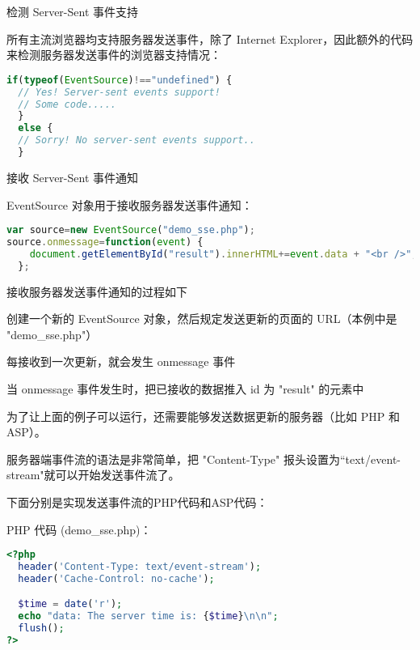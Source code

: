 \begin{compactenum}
\item 检测 Server-Sent 事件支持



所有主流浏览器均支持服务器发送事件，除了 Internet Explorer，因此额外的代码来检测服务器发送事件的浏览器支持情况：

\begin{lstlisting}[language=JavaScript]
  if(typeof(EventSource)!=="undefined") {
  // Yes! Server-sent events support!
  // Some code.....
  }
  else {
  // Sorry! No server-sent events support..
  }
\end{lstlisting}


\item 接收 Server-Sent 事件通知

EventSource 对象用于接收服务器发送事件通知：

\begin{lstlisting}[language=JavaScript]
var source=new EventSource("demo_sse.php");
source.onmessage=function(event) {
    document.getElementById("result").innerHTML+=event.data + "<br />";
  };
\end{lstlisting}

接收服务器发送事件通知的过程如下

\begin{compactitem}
\item 创建一个新的 EventSource 对象，然后规定发送更新的页面的 URL（本例中是 "demo\_sse.php"）
\item 每接收到一次更新，就会发生 onmessage 事件
\item 当 onmessage 事件发生时，把已接收的数据推入 id 为 "result" 的元素中
\end{compactitem}




\end{compactenum}


为了让上面的例子可以运行，还需要能够发送数据更新的服务器（比如 PHP 和 ASP）。

服务器端事件流的语法是非常简单，把 "Content-Type" 报头设置为``text/event-stream"就可以开始发送事件流了。

下面分别是实现发送事件流的PHP代码和ASP代码：

PHP 代码 (demo\_sse.php)：

\begin{lstlisting}[language=PHP]
<?php
  header('Content-Type: text/event-stream');
  header('Cache-Control: no-cache');

  $time = date('r');
  echo "data: The server time is: {$time}\n\n";
  flush();
?>
\end{lstlisting}


